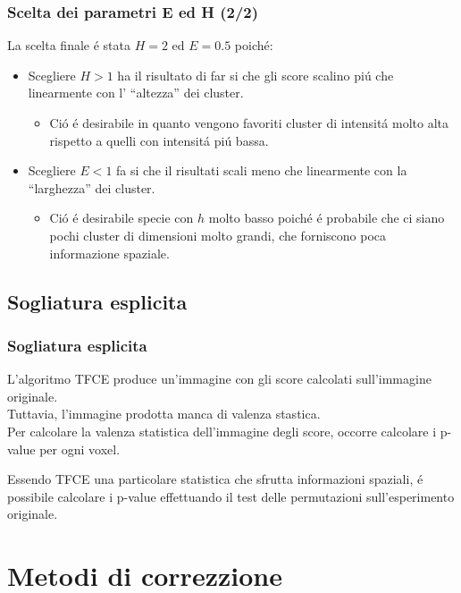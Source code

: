 \documentclass{beamer}
\begin{document}
\begin{frame}
\frametitle{Scelta dei parametri E ed H (2/2)}
La scelta finale \'e stata $H = 2$ ed $E = 0.5$ poich\'e:
\bigskip
\begin{itemize}

\item Scegliere $H > 1$ ha il risultato di far si che gli score scalino pi\'u che linearmente con l' ``altezza'' dei cluster.
\begin{itemize}
\item Ci\'o \'e desirabile in quanto vengono favoriti cluster di intensit\'a molto alta rispetto a quelli con intensit\'a pi\'u bassa.
\end{itemize}
\medskip
\item Scegliere $E < 1$ fa si che il risultati scali meno che linearmente con la ``larghezza'' dei cluster.
\begin{itemize}
\item Ci\'o \'e desirabile specie con $h$ molto basso poich\'e \'e probabile che ci siano pochi cluster di dimensioni molto grandi, che forniscono poca informazione spaziale.
\end{itemize}


\end{itemize}
\end{frame}

\subsection{Sogliatura esplicita}
\begin{frame}
\frametitle{Sogliatura esplicita}
L'algoritmo TFCE produce un'immagine con gli score calcolati sull'immagine originale.\\
\medskip
Tuttavia, l'immagine prodotta manca di valenza stastica.\\
\medskip
Per calcolare la valenza statistica dell'immagine degli score, occorre calcolare i \alert{p-value} per ogni voxel.

Essendo TFCE una particolare statistica che sfrutta informazioni spaziali, \'e possibile calcolare i p-value effettuando il test delle permutazioni sull'esperimento originale.
\end{frame}

\section{Metodi di correzzione}
\end{document}
